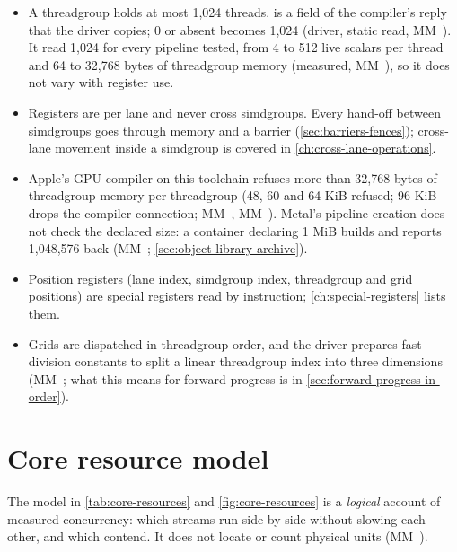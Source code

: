 \begin{itemize}
\item A threadgroup holds at most 1,024 threads.  is a field of the compiler's reply that
  the driver copies; 0 or absent becomes 1,024 (driver, static read, MM~). It read 1,024 for every pipeline
  tested, from 4 to 512 live scalars per thread and 64 to 32,768 bytes of threadgroup memory (measured, MM~), so it
  does not vary with register use.
\item Registers are per lane and never cross simdgroups. Every hand-off between simdgroups goes through memory and a
  barrier (\cref{sec:barriers-fences}); cross-lane movement inside a simdgroup is covered in \cref{ch:cross-lane-operations}.
\item Apple's GPU compiler on this toolchain refuses more than 32,768 bytes of threadgroup memory per threadgroup (48, 60
  and 64 KiB refused; 96 KiB drops the compiler connection; MM~, MM~). Metal's pipeline creation does not check the
  declared size: a container declaring 1 MiB builds and reports 1,048,576 back (MM~; \cref{sec:object-library-archive}).
\item Position registers (lane index, simdgroup index, threadgroup and grid positions) are special registers read by
  instruction; \cref{ch:special-registers} lists them.
\item Grids are dispatched in threadgroup order, and the driver prepares fast-division constants to split a linear
  threadgroup index into three dimensions (MM~; what this means for forward progress is in \cref{sec:forward-progress-in-order}).
\end{itemize}

\section{Core resource model}\label{sec:core-logical-resource}



The model in \cref{tab:core-resources} and \cref{fig:core-resources} is a \emph{logical} account of measured concurrency: which streams run side by side without slowing each
other, and which contend. It does not locate or count physical units (MM~).

